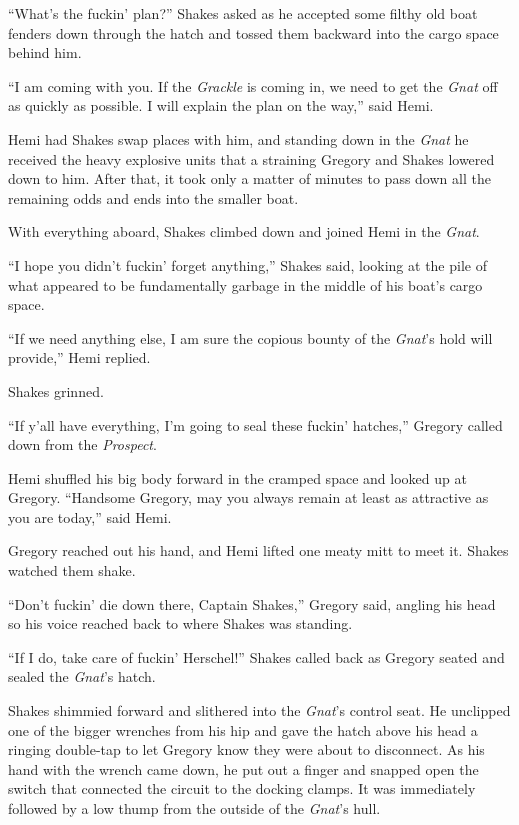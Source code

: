 \documentclass[
]{scrbook}
\begin{document}
``What's the fuckin' plan?'' Shakes asked as he accepted some filthy old
boat fenders down through the hatch and tossed them backward into the
cargo space behind him.

``I am coming with you. If the \emph{Grackle} is coming in, we need to
get the \emph{Gnat} off as quickly as possible. I will explain the plan
on the way,'' said Hemi.

Hemi had Shakes swap places with him, and standing down in the
\emph{Gnat} he received the heavy explosive units that a straining
Gregory and Shakes lowered down to him. After that, it took only a
matter of minutes to pass down all the remaining odds and ends into the
smaller boat.

With everything aboard, Shakes climbed down and joined Hemi in the
\emph{Gnat}.

``I hope you didn't fuckin' forget anything,'' Shakes said, looking at
the pile of what appeared to be fundamentally garbage in the middle of
his boat's cargo space.

``If we need anything else, I am sure the copious bounty of the
\emph{Gnat}'s hold will provide,'' Hemi replied.

Shakes grinned.

``If y'all have everything, I'm going to seal these fuckin' hatches,''
Gregory called down from the \emph{Prospect}.

Hemi shuffled his big body forward in the cramped space and looked up at
Gregory. ``Handsome Gregory, may you always remain at least as
attractive as you are today,'' said Hemi.

Gregory reached out his hand, and Hemi lifted one meaty mitt to meet it.
Shakes watched them shake.

``Don't fuckin' die down there, Captain Shakes,'' Gregory said, angling
his head so his voice reached back to where Shakes was standing.

``If I do, take care of fuckin' Herschel!'' Shakes called back as
Gregory seated and sealed the \emph{Gnat}'s hatch.

Shakes shimmied forward and slithered into the \emph{Gnat}'s control
seat. He unclipped one of the bigger wrenches from his hip and gave the
hatch above his head a ringing double-tap to let Gregory know they were
about to disconnect. As his hand with the wrench came down, he put out a
finger and snapped open the switch that connected the circuit to the
docking clamps. It was immediately followed by a low thump from the
outside of the \emph{Gnat}'s hull.
\end{document}
